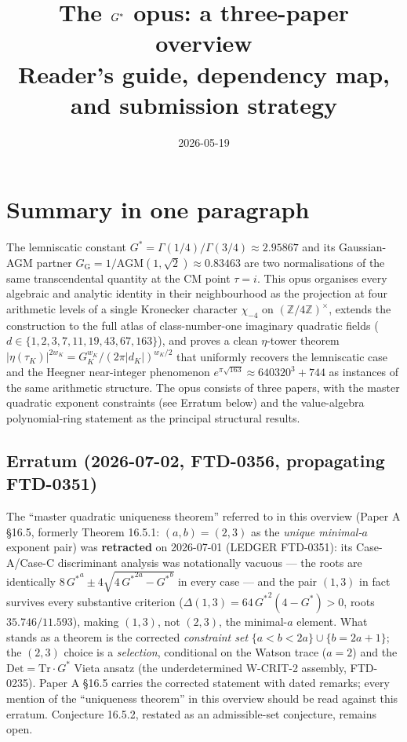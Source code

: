 \documentclass[11pt]{amsart}
\title{The $\Gs$ opus: a three-paper overview\\
\large Reader's guide, dependency map, and submission strategy}
\author{}
\date{2026-05-19}
\newcommand{\Gs}{G^{*}}
\newcommand{\GG}{G_{\!\scriptscriptstyle\mathrm{G}}}
\newcommand{\GK}{G_{K}}
\newcommand{\Z}{\mathbb{Z}}
\begin{document}
\maketitle

\section*{Summary in one paragraph}

The lemniscatic constant $\Gs = \Gamma(1/4)/\Gamma(3/4) \approx 2.95867$
and its Gaussian-AGM partner $\GG = 1/\mathrm{AGM}(1,\sqrt 2) \approx 0.83463$
are two normalisations of the same transcendental quantity at the CM point
$\tau = i$. This opus organises every algebraic and analytic identity in
their neighbourhood as the projection at four arithmetic levels of a
single Kronecker character $\chi_{-4}$ on $(\Z/4\Z)^{\times}$, extends the
construction to the full atlas of class-number-one imaginary quadratic
fields ($d \in \{1, 2, 3, 7, 11, 19, 43, 67, 163\}$), and proves a clean
$\eta$-tower theorem $|\eta(\tau_K)|^{2 w_K} = \GK^{w_K}/(2\pi|d_K|)^{w_K/2}$
that uniformly recovers the lemniscatic case and the Heegner near-integer
phenomenon $e^{\pi\sqrt{163}} \approx 640320^{3} + 744$ as instances of
the same arithmetic structure. The opus consists of three papers, with the master quadratic exponent
constraints (see Erratum below) and the value-algebra polynomial-ring
statement as the principal structural results.

\subsection*{Erratum (2026-07-02, FTD-0356, propagating FTD-0351)}

The ``master quadratic uniqueness theorem'' referred to in this overview
(Paper A \S 16.5, formerly Theorem 16.5.1: $(a,b)=(2,3)$ as the
\emph{unique minimal-$a$} exponent pair) was \textbf{retracted} on
2026-07-01 (LEDGER FTD-0351): its Case-A/Case-C discriminant analysis was
notationally vacuous --- the roots are identically
$8\,{\Gs}^{a} \pm 4\sqrt{4\,{\Gs}^{2a} - {\Gs}^{b}}$ in every case --- and
the pair $(1,3)$ in fact survives every substantive criterion
($\Delta(1,3) = 64\,{\Gs}^{2}(4-{\Gs}) > 0$, roots $35.746/11.593$), making
$(1,3)$, not $(2,3)$, the minimal-$a$ element. What stands as a theorem is
the corrected \emph{constraint set} $\{a < b < 2a\} \cup \{b = 2a+1\}$;
the $(2,3)$ choice is a \emph{selection}, conditional on the Watson trace
($a = 2$) and the $\mathrm{Det} = \mathrm{Tr}\cdot{\Gs}$ Vieta ansatz
(the underdetermined W-CRIT-2 assembly, FTD-0235). Paper A \S 16.5 carries
the corrected statement with dated remarks; every mention of the
``uniqueness theorem'' in this overview should be read against this
erratum. Conjecture 16.5.2, restated as an admissible-set conjecture,
remains open.
\end{document}
